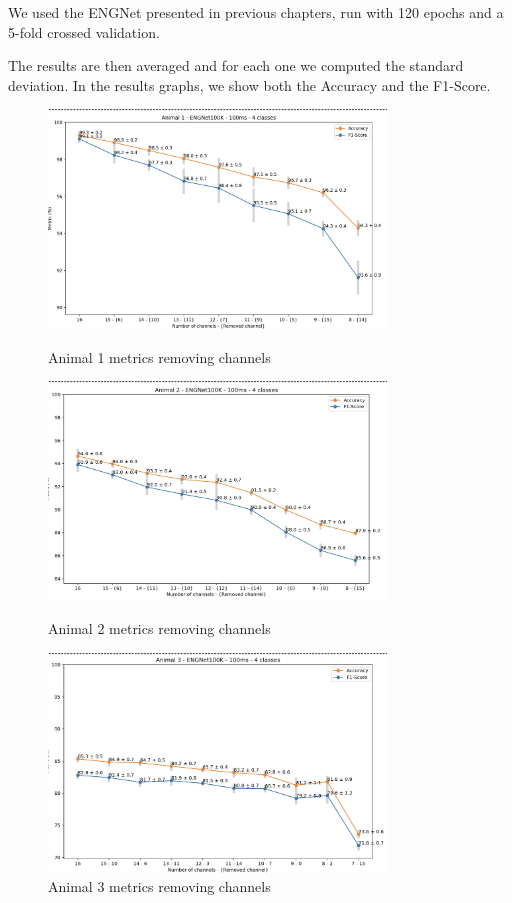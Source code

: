 \documentclass{Configuration_Files/PoliMi3i_thesis}
\begin{document}
We used the ENGNet presented in previous chapters, run with 120 epochs and a 5-fold crossed validation.

The results are then averaged and for each one we computed the standard deviation.
In the results graphs, we show both the Accuracy and the F1-Score.


\begin{figure}[H]
    \centering
    \includegraphics[width=0.8\textwidth]{Results Matteo/figure2}
    \label{figure2}
    \caption{Animal 1 metrics removing channels}
\end{figure}

\begin{figure}[H]
    \centering
    \includegraphics[width=0.8\textwidth]{Results Matteo/figure3}
    \label{figure3}
    \caption{Animal 2 metrics removing channels}
\end{figure}

\begin{figure}[H]
    \centering
    \includegraphics[width=0.8\textwidth]{Results Matteo/figure4}
    \caption{Animal 3 metrics removing channels}
    \label{figure4}
\end{figure}
\end{document}
